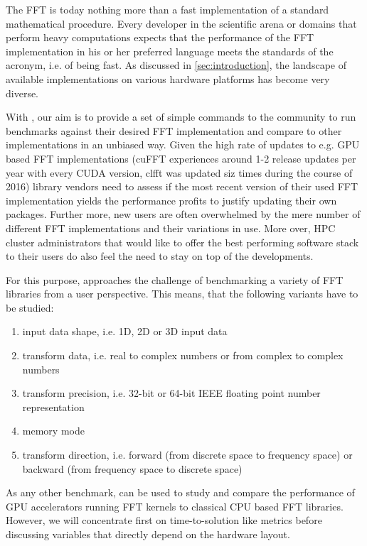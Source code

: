 The FFT is today nothing more than a fast implementation of a standard mathematical procedure. Every developer in the scientific arena or domains that perform heavy computations expects that the performance of the FFT implementation in his or her preferred language meets the standards of the acronym, i.e. of being fast. As discussed in \cref{sec:introduction}, the landscape of available implementations on various hardware platforms has become very diverse. 

With \gearshifft{}, our aim is to provide a set of simple commands to the community to run benchmarks against their desired FFT implementation and compare to other implementations in an unbiased way. Given the high rate of updates to e.g. GPU based FFT implementations (cuFFT experiences around 1-2 release updates per year with every CUDA version, clfft was updated siz times during the course of 2016) library vendors need to assess if the most recent version of their used FFT implementation yields the performance profits to justify updating their own packages. Further more, new users are often overwhelmed by the mere number of different FFT implementations and their variations in use. More over, HPC cluster administrators that would like to offer the best performing software stack to their users do also feel the need to stay on top of the developments. 

For this purpose, \gearshifft{} approaches the challenge of benchmarking a variety of FFT libraries from a user perspective. This means, that the following variants have to be studied:

\begin{enumerate}
\item input data shape, i.e. 1D, 2D or 3D input data
\item transform data, i.e. real to complex numbers or from complex to complex numbers
\item transform precision, i.e. 32-bit or 64-bit IEEE floating point number representation
\item memory mode
\item transform direction, i.e. forward (from discrete space to frequency space) or backward (from frequency space to discrete space)
\end{enumerate}
 
As any other benchmark, \gearshifft{} can be used to study and compare the performance of GPU accelerators running FFT kernels to classical CPU based FFT libraries. However, we will concentrate first on time-to-solution like metrics before discussing variables that directly depend on the hardware layout.  
